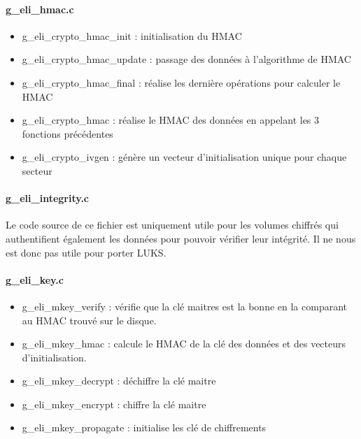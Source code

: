 \paragraph{g\_eli\_hmac.c}
\begin{itemize}
	\item g\_eli\_crypto\_hmac\_init : initialisation du HMAC
	\item g\_eli\_crypto\_hmac\_update : passage des données à l'algorithme
		de HMAC
	\item g\_eli\_crypto\_hmac\_final : réalise les dernière opérations 
		pour calculer le HMAC
	\item g\_eli\_crypto\_hmac : réalise le HMAC des données en appelant 
		les 3 fonctions précédentes
	\item g\_eli\_crypto\_ivgen : génère un vecteur d'initialisation unique
		pour chaque secteur
\end{itemize}

\paragraph{g\_eli\_integrity.c}
Le code source de ce fichier est uniquement utile pour les volumes chiffrés qui
authentifient également les données pour pouvoir vérifier leur intégrité.
Il ne nous est donc pas utile pour porter LUKS.
\paragraph{g\_eli\_key.c}
\begin{itemize}
	\item g\_eli\_mkey\_verify : vérifie que la clé maitres est la bonne en
		la comparant au HMAC trouvé sur le disque.
	\item g\_eli\_mkey\_hmac : calcule le HMAC de la clé des données et des
		vecteurs d'initialisation.
	\item g\_eli\_mkey\_decrypt : déchiffre la clé maitre
	\item g\_eli\_mkey\_encrypt : chiffre la clé maitre
	\item g\_eli\_mkey\_propagate : initialise les clé de chiffrements
\end{itemize}
